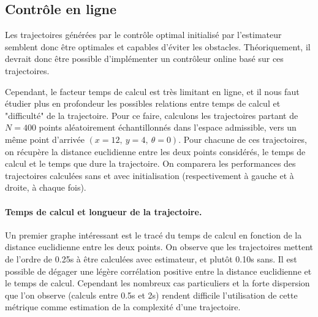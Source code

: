 \documentclass[a4paper,12pt]{report}
\begin{document}
\subsection{Contrôle en ligne}
Les trajectoires générées par le contrôle optimal initialisé par l'estimateur semblent donc être optimales et capables d'éviter les obstacles. Théoriquement, il devrait donc être possible d'implémenter un contrôleur online basé sur ces trajectoires. 

Cependant, le facteur temps de calcul est très limitant en ligne, et il nous faut étudier plus en profondeur les possibles relations entre temps de calcul et "difficulté" de la trajectoire. Pour ce faire, calculons les trajectoires partant de $N=400$ points aléatoirement échantillonnés dans l'espace admissible, vers un même point d'arrivée $(x=12,\ y=4,\ \theta=0)$. Pour chacune de ces trajectoires, on récupère la distance euclidienne entre les deux points considérés, le temps de calcul et le temps que dure la trajectoire. On comparera les performances des trajectoires calculées sans et avec initialisation (respectivement à gauche et à droite, à chaque fois).


\paragraph{Temps de calcul et longueur de la trajectoire.}
Un premier graphe intéressant est le tracé du temps de calcul en fonction de la distance euclidienne entre les deux points. On observe que les trajectoires mettent de l'ordre de 0.25s à être calculées avec estimateur, et plutôt 0.10s sans. Il est possible de dégager une légère corrélation positive entre la distance euclidienne et le temps de calcul. Cependant les nombreux cas particuliers et la forte dispersion que l'on observe (calculs entre 0.5s et 2s) rendent difficile l'utilisation de cette métrique comme estimation de la complexité d'une trajectoire.
\end{document}

